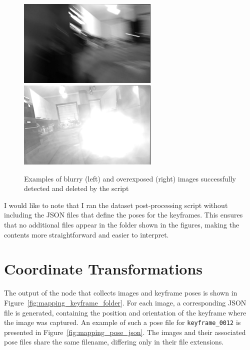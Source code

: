 \begin{figure}[htbp]
	\centering
	\includegraphics[width=67mm, keepaspectratio]{figures_jpg/example_for_blurry.jpg}\hspace{1cm}
	\includegraphics[width=67mm, keepaspectratio]{figures_jpg/example_for_overexposed.jpg}\\\vspace{5mm}
	\caption{Examples of blurry (left) and overexposed (right) images successfully detected and deleted by the script}
	\label{fig:blurry_overexposed_example}
\end{figure}
\FloatBarrier

I would like to note that I ran the dataset post-processing script without including the JSON files that define the poses for the keyframes. This ensures that no additional files appear in the folder shown in the figures, making the contents more straightforward and easier to interpret.

\section{Coordinate Transformations}

The output of the node that collects images and keyframe poses is shown in Figure~\ref{fig:mapping_keyframe_folder}. For each image, a corresponding JSON file is generated, containing the position and orientation of the keyframe where the image was captured. An example of such a pose file for \verb|keyframe_0012| is presented in Figure~\ref{fig:mapping_pose_json}. The images and their associated pose files share the same filename, differing only in their file extensions.

